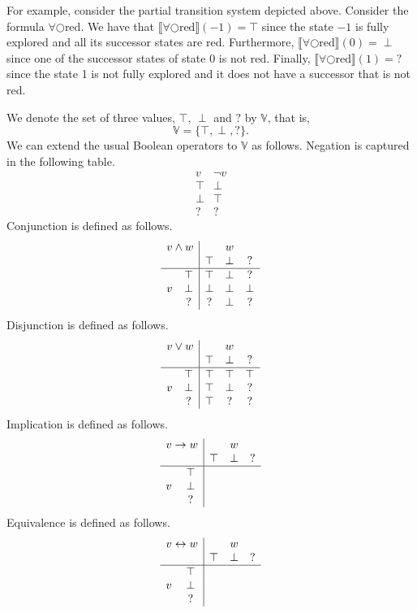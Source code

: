 \documentclass[12pt]{article}
\newcommand{\nxt}{\bigcirc}
\theoremstyle{definition}
\newcommand{\satisfaction}[1]{\llbracket #1 \rrbracket}
\begin{document}
For example, consider the partial transition system depicted above.  Consider the formula $\forall \nxt \mbox{red}$.  We have that $\satisfaction{\forall \nxt \mbox{red}}(-1) = \top$ since the state $-1$ is fully explored and all its successor states are red.  Furthermore, $\satisfaction{\forall \nxt \mbox{red}}(0) = \perp$ since one of the  successor states of state 0 is not red.  Finally, $\satisfaction{\forall \nxt \mbox{red}}(1) = \mathord{?}$ since the state 1 is not fully explored and it does not have a successor that is not red.

We denote the set of three values, $\top$, $\perp$ and $?$ by $\mathbb{V}$, that is,
\[
\mathbb{V} = \{ \top, \perp, \mathord{?} \}.
\]
We can extend the usual Boolean operators to $\mathbb{V}$ as follows.  Negation is captured in the following table.
\[
\begin{array}{c|c}
v & \neg v\\\hline
\top & \perp\\
\perp & \top\\
\mathord{?} & \mathord{?}
\end{array}
\]
Conjunction is defined as follows.
\[
\begin{array}{cc|ccc}
\multicolumn{2}{c|}{v \wedge w} & & w &\\
&& \top & \perp & \mathord{?}\\\hline
& \top & \top & \perp & \mathord{?}\\
v & \perp & \perp & \perp & \perp\\
& \mathord{?} & \mathord{?} & \perp & \mathord{?}
\end{array}
\]
Disjunction is defined as follows.
\[
\begin{array}{cc|ccc}
\multicolumn{2}{c|}{v \vee w} & & w &\\
&& \top & \perp & \mathord{?}\\\hline
& \top & \top & \top & \top\\
v & \perp & \top & \perp & \mathord{?}\\
& \mathord{?} & \top & \mathord{?} & \mathord{?}
\end{array}
\]
Implication is defined as follows.
\[
\begin{array}{cc|ccc}
\multicolumn{2}{c|}{v \rightarrow w} & & w &\\
&& \top & \perp & \mathord{?}\\\hline
& \top &  &  & \\
v & \perp &  &  & \\
& \mathord{?} &  &  & 
\end{array}
\]
Equivalence is defined as follows.
\[
\begin{array}{cc|ccc}
\multicolumn{2}{c|}{v \leftrightarrow w} & & w &\\
&& \top & \perp & \mathord{?}\\\hline
& \top &  &  & \\
v & \perp &  &  & \\
& \mathord{?} &  &  & 
\end{array}
\]
\end{document}
